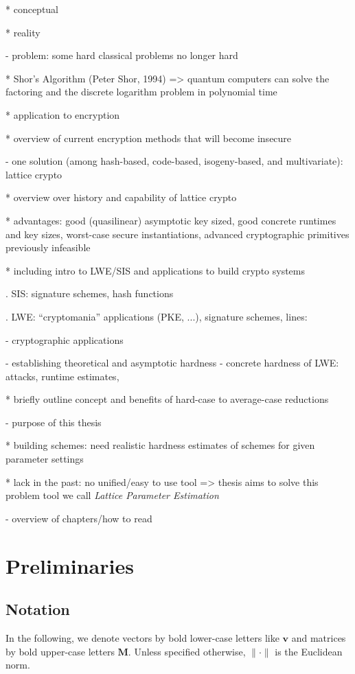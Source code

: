 \documentclass[
  a4paper,  %
  twoside,  %
  bibliography=totoc,
  headsepline,
  cleardoublepage=empty,
  parskip=half,
  draft=false
]{scrbook}
\begin{document}
  * conceptual

  * reality


- problem: some hard classical problems no longer hard

  * Shor's Algorithm (Peter Shor, 1994) %
    => quantum computers can solve the factoring and the discrete logarithm problem in polynomial time

  * application to encryption

  * overview of current encryption methods that will become insecure


- one solution (among hash-based, code-based, isogeny-based, and multivariate): lattice crypto

  * overview over history and capability of lattice crypto

  * advantages: good (quasilinear) asymptotic key sized, good concrete runtimes and key sizes, worst-case secure instantiations, advanced cryptographic primitives previously infeasible

  * including intro to LWE/SIS and applications to build crypto systems

    . SIS: signature schemes, hash functions

    . LWE: ``cryptomania'' applications (PKE, ...), signature schemes, lines:

      - cryptographic applications

      - establishing theoretical and asymptotic hardness \cite{Reg05} %
        \cite{BLPRS13, MP13} 
      - concrete hardness of LWE: attacks, runtime estimates, 

  * briefly outline concept and benefits of hard-case to average-case reductions


- purpose of this thesis

  * building schemes: need realistic hardness estimates of schemes for given parameter settings

  * lack in the past: no unified/easy to use tool => thesis aims to solve this problem
    tool we call \textit{Lattice Parameter Estimation} 


- overview of chapters/how to read



\chapter{Preliminaries} \label{chap:Preliminaries}

\section{Notation}
In the following, we denote vectors by bold lower-case letters like $\textbf{v}$ and matrices by bold upper-case letters $\textbf{M}$. Unless specified otherwise, $\| \cdot \|$ is the Euclidean norm. %
\end{document}

